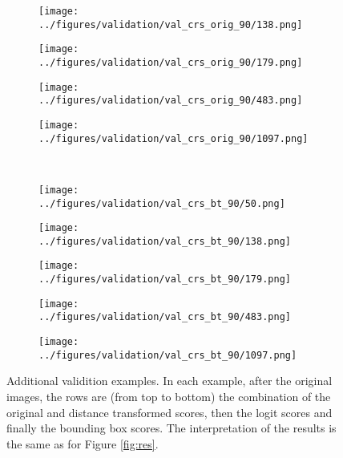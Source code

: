 \begin{figure}[h!]
\begin{subfigure}{0.18\textwidth}
		\label{fig:1}
	\end{subfigure}
	\begin{subfigure}{0.18\textwidth}
		\centering
		\texttt{[image: ../figures/validation/val\_crs\_orig\_90/138.png]}
		\label{fig:1}
	\end{subfigure}
	\begin{subfigure}{0.18\textwidth}
		\centering
		\texttt{[image: ../figures/validation/val\_crs\_orig\_90/179.png]}
		\label{fig:1}
	\end{subfigure}
	\begin{subfigure}{0.18\textwidth}
		\centering
		\texttt{[image: ../figures/validation/val\_crs\_orig\_90/483.png]}
		\label{fig:1}
	\end{subfigure}
	\begin{subfigure}{0.18\textwidth}
		\centering
		\texttt{[image: ../figures/validation/val\_crs\_orig\_90/1097.png]}
		\label{fig:1}
	\end{subfigure}
			\vspace{-0.35cm}
	\\
		\begin{subfigure}[b]{0.03\textwidth} %
		\centering
	\end{subfigure}
	\hspace{0.05cm}
	\begin{subfigure}{0.18\textwidth}
		\centering
		\texttt{[image: ../figures/validation/val\_crs\_bt\_90/50.png]}
		\label{fig:1}
	\end{subfigure}
	\begin{subfigure}{0.18\textwidth}
		\centering
		\texttt{[image: ../figures/validation/val\_crs\_bt\_90/138.png]}
		\label{fig:1}
	\end{subfigure}
	\begin{subfigure}{0.18\textwidth}
		\centering
		\texttt{[image: ../figures/validation/val\_crs\_bt\_90/179.png]}
		\label{fig:1}
	\end{subfigure}
	\begin{subfigure}{0.18\textwidth}
		\centering
		\texttt{[image: ../figures/validation/val\_crs\_bt\_90/483.png]}
		\label{fig:1}
	\end{subfigure}
	\begin{subfigure}{0.18\textwidth}
		\centering
		\texttt{[image: ../figures/validation/val\_crs\_bt\_90/1097.png]}
		\label{fig:1}
	\end{subfigure}
	\label{fig:grid}
	\caption{Additional validition examples. In each example, after the original images, the rows are (from top to bottom) the combination of the original and distance transformed scores, then the logit scores and finally the bounding box scores. The interpretation of the results is the same as for Figure \ref{fig:res}.}\label{fig:polpysex2}
\end{figure}

